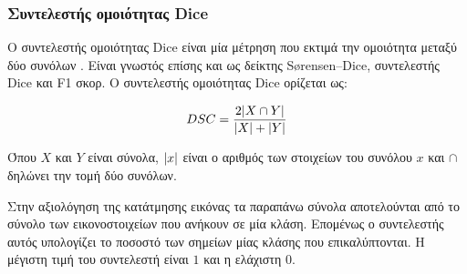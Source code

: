 \documentclass[a4paper,12pt]{article}
\DeclarePairedDelimiter\abs{\lvert}{\rvert}
\begin{document}
\subsubsection{Συντελεστής ομοιότητας Dice}

Ο συντελεστής ομοιότητας Dice είναι μία μέτρηση που εκτιμά την ομοιότητα μεταξύ
δύο συνόλων \cite{dice:1}. Είναι γνωστός επίσης και ως δείκτης Sørensen–Dice,
συντελεστής Dice και F1 σκορ. Ο συντελεστής ομοιότητας Dice ορίζεται ως:

\begin{equation*}
    DSC = \frac{2 \abs{X \cap Y}} {\abs{X} + \abs{Y}}
\end{equation*}

Όπου $X$ και $Y$ είναι σύνολα, $\abs{x}$ είναι ο αριθμός των στοιχείων του
συνόλου $x$ και $\cap$ δηλώνει την τομή δύο συνόλων.

Στην αξιολόγηση της κατάτμησης εικόνας τα παραπάνω σύνολα αποτελούνται από το
σύνολο των εικονοστοιχείων που ανήκουν σε μία κλάση. Επομένως ο συντελεστής
αυτός υπολογίζει το ποσοστό των σημείων μίας κλάσης που επικαλύπτονται. Η
μέγιστη τιμή του συντελεστή είναι $1$ και η ελάχιστη $0$.

\newpage

\printbibliography
\end{document}
